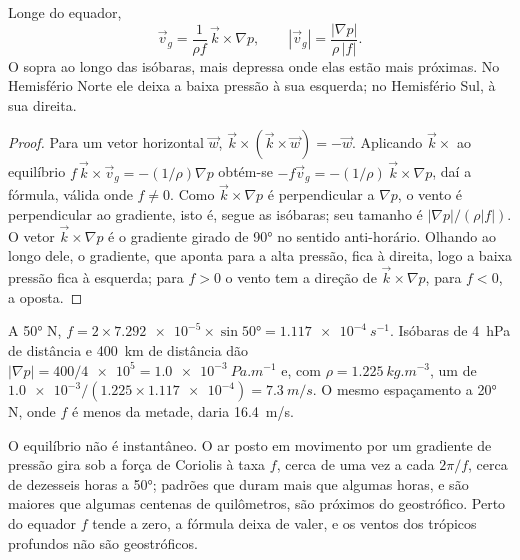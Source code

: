 \begin{theorem}\label{thm:b1:atmospheric-circulation:geostrophic}
Longe do equador,
\[
  \vec v_g = \frac{1}{\rho f}\,\vec k\times\nabla p, \qquad
  |\vec v_g| = \frac{|\nabla p|}{\rho\,|f|} .
\]
O  sopra ao longo das isóbaras, mais depressa onde elas estão mais próximas. No
Hemisfério Norte ele deixa a baixa pressão à sua esquerda; no Hemisfério Sul, à sua direita.
\end{theorem}

\begin{proof}
Para um vetor horizontal $\vec w$, $\vec k\times(\vec k\times\vec w) = -\vec w$. Aplicando $\vec k\times$
ao equilíbrio $f\,\vec k\times\vec v_g = -(1/\rho)\nabla p$ obtém-se $-f\vec v_g = -(1/\rho)\,\vec k\times\nabla p$,
daí a fórmula, válida onde $f \neq 0$. Como $\vec k\times\nabla p$ é perpendicular a $\nabla p$, o
vento é perpendicular ao gradiente, isto é, segue as isóbaras; seu tamanho é $|\nabla
p|/(\rho|f|)$. O vetor $\vec k\times\nabla p$ é o gradiente girado de \ang{90} no sentido
anti-horário. Olhando ao longo dele, o gradiente, que aponta para a alta pressão, fica à direita,
logo a baixa pressão fica à esquerda; para $f > 0$ o vento tem a direção de $\vec k\times\nabla p$,
para $f < 0$, a oposta.
\end{proof}

\begin{example}\label{ex:b1:atmospheric-circulation:geostrophic}
A \ang{50} N, $f = 2 \times \num{7.292e-5} \times \sin\ang{50} = \qty{1.117e-4}{s^{-1}}$.
Isóbaras de \qty{4}{hPa} de distância e \qty{400}{km} de distância dão $|\nabla p| = 400/\num{4e5} =
\qty{1.0e-3}{Pa.m^{-1}}$ e, com $\rho = \qty{1.225}{kg.m^{-3}}$, um  de
$\num{1.0e-3}/(1.225 \times \num{1.117e-4}) = \qty{7.3}{m/s}$. O mesmo espaçamento a \ang{20} N, onde
$f$ é menos da metade, daria \qty{16.4}{m/s}.
\end{example}

O equilíbrio não é instantâneo. O ar posto em movimento por um gradiente de pressão gira sob a força
de Coriolis à taxa $f$, cerca de uma vez a cada $2\pi/f$, cerca de dezesseis horas a \ang{50}; padrões
que duram mais que algumas horas, e são maiores que algumas centenas de quilômetros, são próximos do
geostrófico. Perto do equador $f$ tende a zero, a fórmula deixa de valer, e os ventos dos trópicos
profundos não são geostróficos.

